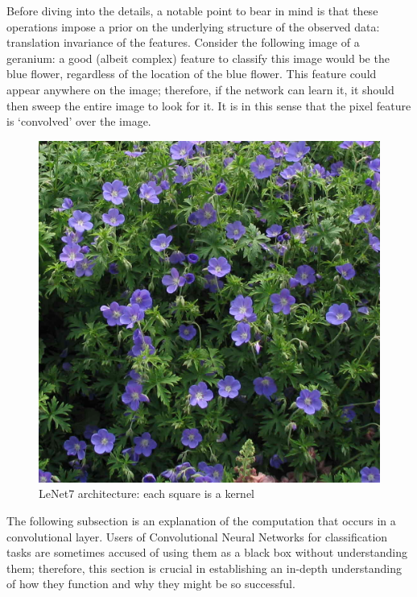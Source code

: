 \documentclass[a4paper,11pt]{article}
\begin{document}
Before diving into the details, a notable point to bear in mind is that these operations impose a prior on the underlying structure of the observed data: translation invariance of the features. Consider the following image of a geranium: a good (albeit complex) feature to classify this image would be the blue flower, regardless of the location of the blue flower. This feature could appear anywhere on the image; therefore, if the network can learn it, it should then sweep the entire image to look for it. It is in this sense that the pixel feature is `convolved' over the image. \\

\begin{figure}[h!]
	\centering
	\includegraphics[scale=0.2]{images/geranium.jpg}
	\caption{LeNet7 architecture: each square is a kernel}
\end{figure}

The following subsection is an explanation of the computation that occurs in a convolutional layer. Users of Convolutional Neural Networks for classification tasks are sometimes accused of using them as a black box without understanding them; therefore, this section is crucial in establishing an in-depth understanding of how they function and why they might be so successful. \\
\end{document}
